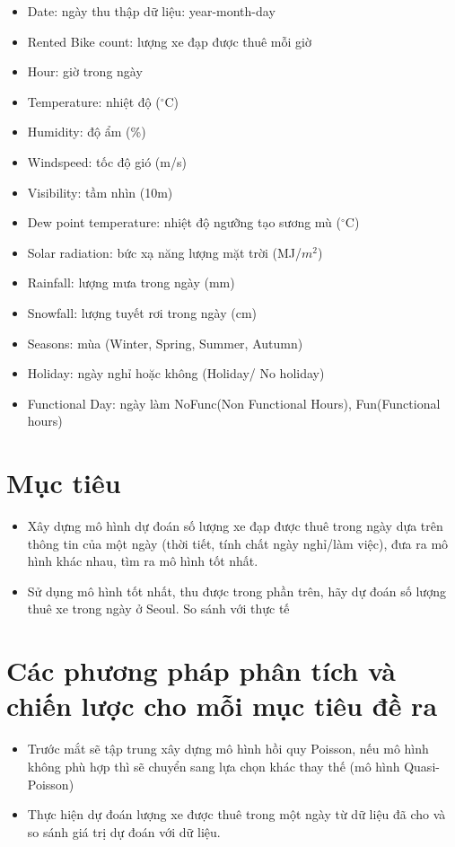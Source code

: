 \documentclass[
  11pt,
  letterpaper,
]{article}
\begin{document}
\begin{itemize}
  \item Date: ngày thu thập dữ liệu: year-month-day  
  \item Rented Bike count: lượng xe đạp được thuê mỗi giờ  
  \item Hour: giờ trong ngày  
  \item Temperature: nhiệt độ ($^{\circ}$C)  
  \item Humidity: độ ẩm (\%)  
  \item Windspeed: tốc độ gió (m/s)  
  \item Visibility: tầm nhìn (10m)  
  \item Dew point temperature: nhiệt độ ngưỡng tạo sương mù ($^{\circ}$C)  
  \item Solar radiation: bức xạ năng lượng mặt trời (MJ/$m^2$)  
  \item Rainfall: lượng mưa trong ngày (mm)  
  \item Snowfall: lượng tuyết rơi trong ngày (cm)  
  \item Seasons: mùa (Winter, Spring, Summer, Autumn)  
  \item Holiday: ngày nghỉ hoặc không (Holiday/ No holiday)  
  \item Functional Day: ngày làm NoFunc(Non Functional Hours), Fun(Functional hours)  
\end{itemize}

\section{Mục tiêu}
\begin{itemize}
    \item Xây dựng mô hình dự đoán số lượng xe đạp được thuê trong ngày dựa trên thông tin của một ngày (thời tiết, tính chất ngày nghỉ/làm việc), đưa ra mô hình khác nhau, tìm ra mô hình tốt nhất.
    \item Sử dụng mô hình tốt nhất, thu được trong phần trên, hãy dự đoán số lượng thuê xe trong ngày ở Seoul. So sánh với thực tế
\end{itemize}
\section{Các phương pháp phân tích và chiến lược cho mỗi mục tiêu đề ra}
\begin{itemize}
    \item Trước mắt sẽ tập trung xây dựng mô hình hồi quy Poisson, nếu mô hình không phù hợp thì sẽ chuyển sang lựa chọn khác thay thế (mô hình Quasi-Poisson)
    \item Thực hiện dự đoán lượng xe được thuê trong một ngày từ dữ liệu đã cho và so sánh giá trị dự đoán với dữ liệu.
\end{itemize}
\end{document}
